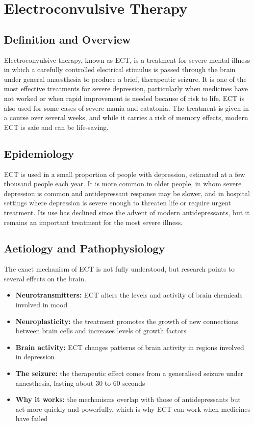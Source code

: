 \chapter{Electroconvulsive Therapy}

\section*{Definition and Overview}
Electroconvulsive therapy, known as ECT, is a treatment for severe mental illness in which a carefully controlled electrical stimulus is passed through the brain under general anaesthesia to produce a brief, therapeutic seizure. It is one of the most effective treatments for severe depression, particularly when medicines have not worked or when rapid improvement is needed because of risk to life. ECT is also used for some cases of severe mania and catatonia. The treatment is given in a course over several weeks, and while it carries a risk of memory effects, modern ECT is safe and can be life-saving.

\section*{Epidemiology}
ECT is used in a small proportion of people with depression, estimated at a few thousand people each year. It is more common in older people, in whom severe depression is common and antidepressant response may be slower, and in hospital settings where depression is severe enough to threaten life or require urgent treatment. Its use has declined since the advent of modern antidepressants, but it remains an important treatment for the most severe illness.

\section*{Aetiology and Pathophysiology}
The exact mechanism of ECT is not fully understood, but research points to several effects on the brain.
\begin{itemize}
    \item \textbf{Neurotransmitters:} ECT alters the levels and activity of brain chemicals involved in mood
    \item \textbf{Neuroplasticity:} the treatment promotes the growth of new connections between brain cells and increases levels of growth factors
    \item \textbf{Brain activity:} ECT changes patterns of brain activity in regions involved in depression
    \item \textbf{The seizure:} the therapeutic effect comes from a generalised seizure under anaesthesia, lasting about 30 to 60 seconds
    \item \textbf{Why it works:} the mechanisms overlap with those of antidepressants but act more quickly and powerfully, which is why ECT can work when medicines have failed
\end{itemize}

